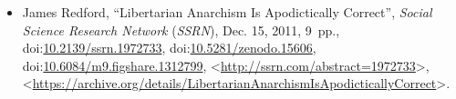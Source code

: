 \documentclass[letterpaper,12pt]{article}
\newcommand{\dsc}{\discretionary{}{}{}}
\begin{document}
\begin{itemize}
\item James Redford, ``Libertarian Anarchism Is Apodictically Correct'', \emph{Social Science Research Network} (\emph{SSRN}), Dec. 15, 2011, 9~pp., doi:\discretionary{}{}{}\href{http://dx.doi.org/10.2139/ssrn.1972733}{10.2139/\dsc ssrn.1972733}\thinspace , doi:\discretionary{}{}{}\href{http://dx.doi.org/10.5281/zenodo.15606}{10.5281/\dsc zenodo.15606}\thinspace , doi:\discretionary{}{}{}\href{http://dx.doi.org/10.6084/m9.figshare.1312799}{10.6084/\dsc m9.figshare.1312799}\thinspace , \textless\url{http://ssrn.com/abstract=1972733}\textgreater , \textless\href{https://archive.org/details/LibertarianAnarchismIsApodicticallyCorrect}{\textsf{https\dsc :\dsc //\dsc archive.org/\dsc details/\dsc Libertarian\dsc Anarchism\dsc Is\dsc Apodictically\dsc Correct}}\textgreater .
\end{itemize}
\end{document}
